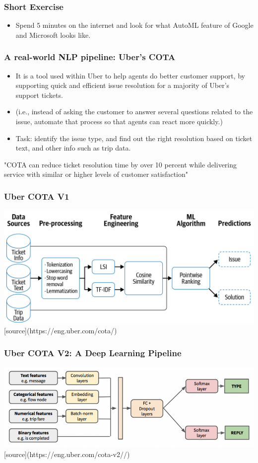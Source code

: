 \documentclass{beamer}
\begin{document}
\begin{frame}
\frametitle{Short Exercise}
\begin{itemize}
    \item Spend 5 minutes on the internet and look for what AutoML feature of Google and Microsoft looks like. 
\end{itemize}
\end{frame}

\begin{frame}
\frametitle{A real-world NLP pipeline: Uber's COTA}
\begin{itemize}
    \item It is a tool used within Uber to help agents do better customer support, by supporting quick and efficient issue resolution for a majority of Uber's support tickets. 
\item (i.e., instead of asking the customer to answer several questions related to the issue, automate that process so that agents can react more quickly.) \pause
\item Task: identify the issue type, and find out the right resolution based on ticket text, and other info such as trip data. 
\end{itemize}
"COTA can reduce ticket resolution time by over 10 percent while delivering service with similar or higher levels of customer satisfaction"
\end{frame}

\begin{frame}
\frametitle{Uber COTA V1}
\includegraphics[width=\textwidth]{figures/nlpcaseuber.png}
[source](https://eng.uber.com/cota/)
\end{frame}


\begin{frame}
\frametitle{Uber COTA V2: A Deep Learning Pipeline}
\includegraphics[width=\textwidth]{figures/cotav2.png}
[source](https://eng.uber.com/cota-v2//)
\end{frame}
\end{document}
